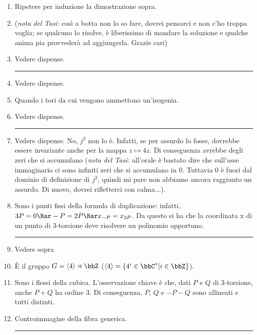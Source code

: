\begin{enumerate}
\item Ripetere per induzione la dimostrazione sopra.
\item ({\it nota del Tasi:} così a botta non lo so fare, dovrei pensarci e non c'ho troppa voglia; se qualcuno lo risolve, è liberissimo di mandare la soluzione e qualche anima pia provvederà ad aggiungerla. Grazie cari)
\item Vedere dispense.
\bigskip
\hrule
\bigskip

\item Vedere dispense.
\item Quando i tori da cui vengono ammettono un'isogenia.
\item Vedere dispense.
\bigskip
\hrule
\bigskip

\item Vedere dispense. No, $j^2$ non lo è. Infatti, se per assurdo lo fosse, dovrebbe essere invariante anche per la mappa $z\mapsto 4z$. Di conseguenza avrebbe degli zeri che si accumulano ({\it nota del Tasi:} all'orale è bastato dire che sull'asse immaginario ci sono infiniti zeri che si accumulano in 0. Tuttavia 0 è fuori dal dominio di definizione di $j^2$, quindi mi pare non abbiamo ancora raggiunto un assurdo. Di nuovo, dovrei rifletterci con calma...).
\item Sono i punti fissi della formula di duplicazione: infatti, $3P=0 \Rar -P=2P \Rar x_{-P}=x_{2P}$. Da questo si ha che la coordinata x di un punto di 3-torsione deve risolvere un polinomio opportuno. 
\bigskip
\hrule
\bigskip

\item Vedere sopra
\item \`E il gruppo $G=\langle 4\rangle \rtimes \bbZ$ ($\langle 4 \rangle = \{ 4^i \in \bbC^* | i \in \bbZ\}$).
\item Sono i flessi della cubica. L'osservazione chiave è che, dati $P$ e $Q$ di 3-torsione, anche $P+Q$ ha ordine 3. Di conseguenza, $P$, $Q$ e $-P-Q$ sono allineati e tutti distinti.
\item Controimmagine della fibra generica.
\bigskip
\hrule
\bigskip


\end{enumerate}
